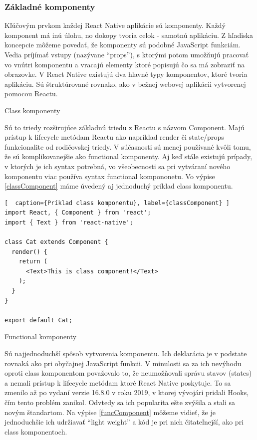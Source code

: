 \subsubsection{Základné komponenty}
Kľúčovým prvkom každej React Native aplikácie sú komponenty. Každý komponent má inú úlohu, no dokopy tvoria celok - samotnú aplikáciu. Z hľadiska koncepcie môžeme povedať, že komponenty sú podobné JavaScript funkciám. Vedia príjímať vstupy (nazývane ``props''), s ktorými potom umožňujú pracovať vo vnútri komponentu a vracajú elementy ktoré popisujú čo sa má zobraziť na obrazovke. V React Native existujú dva hlavné typy komponentov, ktoré tvoria aplikáciu. Sú štruktúrované rovnako, ako v bežnej webovej aplikácii vytvorenej pomocou Reactu.
\begin{itemize}[leftmargin=*]
{\bf \item Class komponenty} \newline
Sú to triedy rozširujúce základnú triedu z Reactu s názvom Component. Majú prístup k lifecycle metódam Reactu ako napríklad render či state/props funkcionalite od rodičovskej triedy. V súčasnosti sú menej používané kvôli tomu, že sú komplikovanejšie ako functional komponenty. Aj keď stále existujú prípady, v ktorých je ich syntax potrebná, vo všeobecnosti sa pri vytváraní nového komponentu viac používa syntax functional kompononetu. Vo výpise \ref{classComponent} máme úvedený aj jednoduchý príklad class komponentu.  \\

\begin{lstlisting}[  caption={Príklad class komponentu}, label={classComponent} ]
import React, { Component } from 'react';
import { Text } from 'react-native';

class Cat extends Component {
  render() {
    return (
      <Text>This is class component!</Text>
    );
  }
}

export default Cat;
\end{lstlisting}
{\bf \item Functional komponenty} \newline
Sú najjednoduchší spôsob vytvorenia komponentu. Ich deklarácia je v podstate rovnaká ako pri obyčajnej JavaScript funkcii. V minulosti sa za ich nevýhodu oproti class komponentom považovalo to, že neumožňovali správu stavov (states) a nemali prístup k lifecycle metódam ktoré React Native poskytuje. To sa zmenilo až po vydaní verzie 16.8.0 v roku 2019, v ktorej vývojári pridali Hooks, čím tento problém zanikol. Odvtedy sa ich popularita ešte zvýšila a stali sa novým štandartom. Na výpise \ref{funcComponent} môžeme vidieť, že je jednoduchšie ich udržiavať ``light weight'' a kód je pri nich čitateľnejší, ako pri class komponentoch. \\


\end{itemize}
